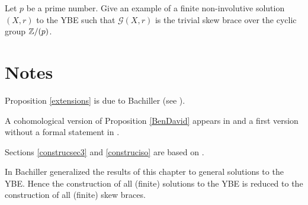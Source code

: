 \begin{prob}
Let $p$ be a prime number.
Give an example of a finite non-involutive solution $(X,r)$ to the YBE such that $\mathcal{G}(X,r)$ is the trivial skew brace over the cyclic group $\mathbb{Z}/(p)$.
\end{prob}




\section{Notes}
Proposition \ref{extensions} is due to Bachiller (see \cite[Theorem~2.1]{MR3320237}).

A
cohomological version of Proposition \ref{BenDavid} appears in \cite[Theorem~4.6]{MR3500774} 
and a first version without a formal statement in \cite[pages
182--183]{MR1722951}. 

Sections \ref{construcsec3} and \ref{construciso} are based on \cite{MR3527540}.

In \cite{MR3835326} Bachiller generalized the results of this chapter to general solutions to the YBE. Hence the construction of all (finite) solutions to the YBE is reduced to the construction of all (finite) skew braces.
